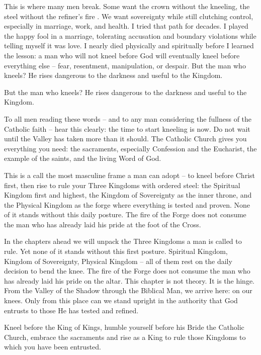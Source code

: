 \documentclass[12pt,a4paper]{book}
\begin{document}
This is where many men break.  Some want the crown without the kneeling, the steel without the refiner's fire .  We want sovereignty while still clutching control,  especially in marriage,  work,  and health.   I tried that path for decades.   I played the happy fool in a marriage,  tolerating accusation and boundary violations while telling myself it was love.   I nearly died physically and spiritually before I learned the lesson: a man who will not kneel before God will eventually kneel before everything else -- fear,  resentment,  manipulation,  or despair.  But the man who kneels? He rises dangerous to the darkness and useful to the Kingdom.

But the man who kneels? He rises dangerous to the darkness and useful to the Kingdom.

To all men reading these words --  and to any man considering the fullness of the Catholic faith --  hear this clearly: the time to start kneeling is now.   Do not wait until the Valley has taken more than it should.  The Catholic Church gives you everything you need: the sacraments,  especially Confession and the Eucharist,  the example of the saints,  and the living Word of God. 

This is a call the most masculine frame a man can adopt -- to kneel before Christ first,  then rise to rule your Three Kingdoms with ordered steel: the Spiritual Kingdom first and highest,  the Kingdom of Sovereignty as the inner throne,  and the Physical Kingdom as the forge where everything is tested and proven.  None of it stands without this daily posture.  The fire of the Forge does not consume the man who has already laid his pride at the foot of the Cross.

In the chapters ahead we will unpack the Three Kingdoms a man is called to rule.  Yet none of it stands without this first posture.  Spiritual Kingdom, Kingdom of Sovereignty, Physical Kingdom -- all of them rest on the daily decision to bend the knee.   The fire of the Forge does not consume the man who has already laid his pride on the altar.  This chapter is not theory.   It is the hinge.   From the Valley of the Shadow through the Biblical Man,  we arrive here: on our knees.   Only from this place can we stand upright in the authority that God entrusts to those He has tested and refined.

Kneel before the King of Kings,  humble yourself before his Bride the Catholic Church, embrace the sacraments and rise as a King to rule those Kingdoms to which you have been entrusted.
\end{document}
